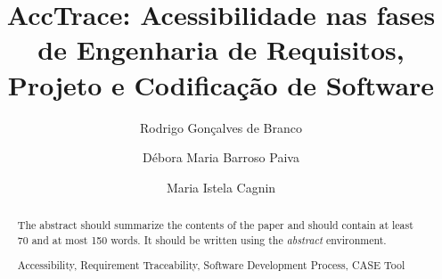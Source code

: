 \documentclass[runningheads,a4paper]{llncs}
\newcommand{\keywords}[1]{\par\addvspace\baselineskip
\noindent\keywordname\enspace\ignorespaces#1}
\begin{document}
\mainmatter  %

\title{AccTrace: Acessibilidade nas fases de Engenharia de Requisitos, Projeto e Codificação de Software}



%
%
\author{Rodrigo Gonçalves de Branco%
\and Débora Maria Barroso Paiva \and Maria Istela Cagnin}



%
%

\maketitle


\begin{abstract}
The abstract should summarize the contents of the paper and should
contain at least 70 and at most 150 words. It should be written using the
\emph{abstract} environment.
\keywords{Accessibility, Requirement Traceability, Software Development
Process, CASE Tool}
\end{abstract}
\end{document}
